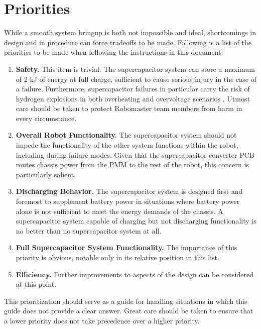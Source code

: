 \documentclass[]{report}
\begin{document}
\section{Priorities}
While a smooth system bringup is both not impossible and ideal, shortcomings in design and in procedure can force tradeoffs to be made. Following is a list of the priorities to be made when following the instructions in this document:
\begin{enumerate}
	\item \textbf{Safety.} This item is trivial. The supercapacitor system can store a maximum of 2 kJ of energy at full charge, sufficient to cause serious injury in the case of a failure. Furthermore, supercapacitor failures in particular carry the risk of hydrogen explosions in both overheating and overvoltage scenarios \cite{MAZLOOMIAN2025104115}. Utmost care should be taken to protect Robomaster team members from harm in every circumstance. 
	\item \textbf{Overall Robot Functionality.} The supercapacitor system should not impede the functionality of the other system functions within the robot, including during failure modes. Given that the supercapacitor converter PCB routes chassis power from the PMM to the rest of the robot, this concern is particularly salient. 
	\item \textbf{Discharging Behavior.} The supercapacitor system is designed first and foremost to supplement battery power in situations where battery power alone is not sufficient to meet the energy demands of the chassis. A supercapacitor system capable of charging but not discharging functionality is no better than no supercapacitor system at all. 
	\item \textbf{Full Supercapacitor System Functionality.} The importance of this priority is obvious, notable only in its relative position in this list. 
	\item \textbf{Efficiency.} Further improvements to aspects of the design can be considered at this point. 
\end{enumerate}
This prioritization should serve as a guide for handling situations in which this guide does not provide a clear answer. Great care should be taken to ensure that a lower priority does not take precedence over a higher priority. 
\end{document}
